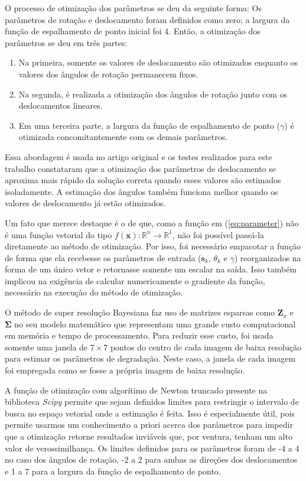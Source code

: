 O processo de otimização dos parâmetros se deu da seguinte forma:
Os parâmetros de rotação e deslocamento foram definidos como zero;
a largura da função de espalhamento de ponto inicial foi 4.
Então, a otimização dos parâmetros se deu em três partes:
\begin{enumerate}
	\item Na primeira, somente os valores de deslocamento são otimizados enquanto os valores dos ângulos de rotação permanecem fixos.
	\item Na segunda, é realizada a otimização dos ângulos de rotação junto com os deslocamentos lineares.
	\item Em uma terceira parte, a largura da função de espalhamento de ponto ($\gamma$) é otimizada concomitantemente com os demais parâmetros.
\end{enumerate}

Essa abordagem é usada no artigo original e os testes realizados para este trabalho
constataram que a otimização dos parâmetros de deslocamento se aproxima mais rápido da
solução correta quando esses valores são estimados isoladamente.
A estimação dos ângulos também funciona melhor quando os valores de deslocamento já estão
otimizados.


Um fato que merece destaque é o de que, como a função em (\ref{eq:parameter}) não é uma
função vetorial do tipo $ f(\mathbf{x}) : \mathbb{R}^n \to \mathbb{R}^1 $, não foi 
possível passá-la diretamente ao método de otimização.
Por isso, foi necessário empacotar a função de forma que ela recebesse os parâmetros de
entrada ($\mathbf{s}_k$, $\theta_k$ e $\gamma$) reorganizados na forma de um único
vetor e retornasse somente um escalar na saída.
Isso também implicou na exigência de calcular numericamente o gradiente da função,
necessário na execução do método de otimização.

O método de super resolução Bayesiana faz uso de matrizes esparsas como $\mathbf{Z}_x$ e $\mathbf{\Sigma}$ no seu modelo matemático que representam uma grande custo computacional em memória e tempo de processamento.
Para reduzir esse custo, foi usada somente uma janela de $7 \times 7$ pontos do centro de
cada imagem de baixa resolução para estimar os parâmetros de degradação.
Neste caso, a janela de cada imagem foi empregada como se fosse a própria
imagem de baixa resolução.

A função de otimização com algorítimo de Newton truncado presente na biblioteca
\emph{Scipy} permite que sejam definidos limites para restringir o intervalo de busca
no espaço vetorial onde a estimação é feita.
Isso é especialmente útil, pois permite usarmos um conhecimento a priori acerca dos
parâmetros para impedir que a otimização retorne resultados inviáveis que, por ventura,
tenham um alto valor de verossimilhança.
Os limites definidos para os parâmetros foram de -4 a 4 no caso dos ângulos de rotação,
-2 a 2 para ambas as direções dos deslocamentos e 1 a 7 para a largura da função de
espalhamento de ponto.

